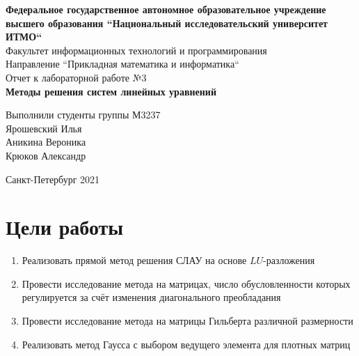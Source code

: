 \documentclass[english]{article}
\date{}
\title{}
\begin{document}
\begin{titlepage}
  \begin{center}
    \large\textbf{Федеральное государственное автономное образовательное учреждение высшего образования ``Национальный исследовательский университет ИТМО``} \\
    \vspace{0.5cm}
    Факультет информационных технологий и программирования \\
    \vspace{0.5cm}
    Направление ``Прикладная математика и информатика`` \\
    \vspace{3cm}
    Отчет к лабораторной работе №3 \\
    \vspace{0.5cm}
    \textbf{Методы решения систем линейных уравнений}
  \end{center}
  \vfill
  \begin{flushright}
    \large
    Выполнили студенты группы М3237 \\
    \vspace{0.5cm}
    Ярошевский Илья \\
    Аникина Вероника \\
    Крюков Александр
  \end{flushright}
  \vspace{3cm}
  \begin{center}
    Санкт-Петербург 2021
  \end{center}
\end{titlepage}

\section{Цели работы}

\begin{enumerate}
    \item Реализовать прямой метод решения СЛАУ на основе \(LU\)-разложения
    \item Провести исследование метода на матрицах, число обусловленности которых регулируется за счёт изменения диагонального  преобладания
    \item Провести исследование метода на матрицы Гильберта различной размерности
    \item Реализовать метод Гаусса с выбором ведущего элемента для плотных матриц
\end{enumerate}
\end{document}
